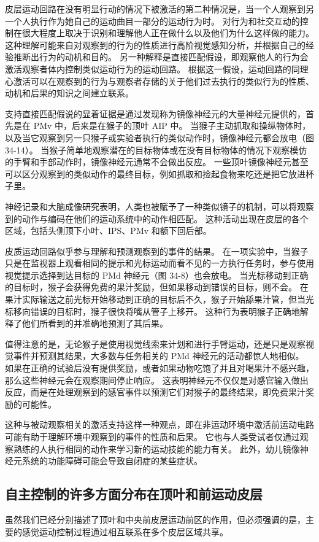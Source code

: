 皮层运动回路在没有明显行动的情况下被激活的第二种情况是，当一个人观察到另一个人执行作为她自己的运动曲目一部分的运动行为时。 对行为和社交互动的控制在很大程度上取决于识别和理解他人正在做什么以及他们为什么这样做的能力。 这种理解可能来自对观察到的行为的性质进行高阶视觉感知分析，并根据自己的经验推断出行为的动机和目的。 另一种解释是直接匹配假设，即观察他人的行为会激活观察者体内控制类似运动行为的运动回路。 根据这一假设，运动回路的同理心激活可以在观察到的行为与观察者存储的关于他们过去执行的类似行为的性质、动机和后果的知识之间建立联系。

支持直接匹配假说的显着证据是通过发现称为镜像神经元的大量神经元提供的，首先是在 PMv 中，后来是在猴子的顶叶 AIP 中。 当猴子主动抓取和操纵物体时，以及当它观察到另一只猴子或实验者执行的类似动作时，镜像神经元都会放电（图 34-14）。 当猴子简单地观察潜在的目标物体或在没有目标物体的情况下观察模仿的手臂和手部动作时，镜像神经元通常不会做出反应。 一些顶叶镜像神经元甚至可以区分观察到的类似动作的最终目标，例如抓取和捡起食物来吃还是把它放进杯子里。

神经记录和大脑成像研究表明，人类也被赋予了一种类似镜子的机制，可以将观察到的动作与编码在他们的运动系统中的动作相匹配。 这种活动出现在皮层的各个区域，包括头侧顶下小叶、IPS、PMv 和额下回后部。

皮质运动回路似乎参与理解和预测观察到的事件的结果。 在一项实验中，当猴子只是在监视器上观看相同的提示和光标运动而看不见的一方执行任务时，参与使用视觉提示选择到达目标的 PMd 神经元（图 34-8）也会放电。 当光标移动到正确的目标时，猴子会获得免费的果汁奖励，但如果移动到错误的目标，则不会。 在果汁实际输送之前光标开始移动到正确的目标后不久，猴子开始舔果汁管，但当光标移向错误的目标时，猴子很快将嘴从管子上移开。 这种行为表明猴子正确地解释了他们所看到的并准确地预测了其后果。

值得注意的是，无论猴子是使用视觉线索来计划和进行手臂运动，还是只是观察视觉事件并预测其结果，大多数与任务相关的 PMd 神经元的活动都惊人地相似。 如果在正确的试验后没有提供奖励，或者如果动物吃饱了并且对喝果汁不感兴趣，那么这些神经元会在观察期间停止响应。 这表明神经元不仅仅是对感官输入做出反应，而是在处理观察到的感官事件以预测它们对猴子的最终结果，即免费果汁奖励的可能性。

这种与被动观察相关的激活支持这样一种观点，即在非运动环境中激活前运动电路可能有助于理解环境中观察到的事件的性质和后果。 它也与人类受试者仅通过观察熟练的人执行相同的动作来学习新的运动技能的能力有关。 此外，幼儿镜像神经元系统的功能障碍可能会导致自闭症的某些症状。

\subsection{自主控制的许多方面分布在顶叶和前运动皮层}
虽然我们已经分别描述了顶叶和中央前皮层运动前区的作用，但必须强调的是，主要的感觉运动控制过程通过相互联系在多个皮层区域共享。

